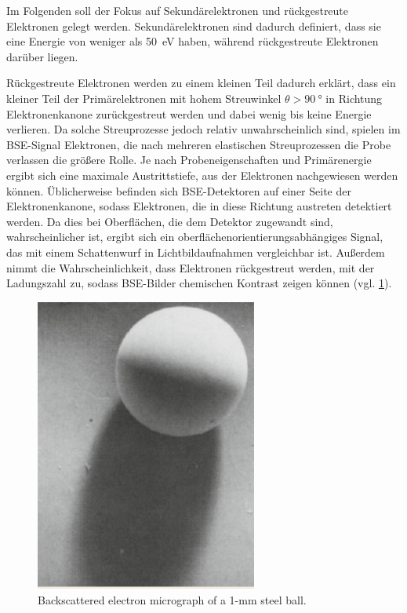 Im Folgenden soll der Fokus auf Sekundärelektronen und rückgestreute Elektronen gelegt werden.
Sekundärelektronen sind dadurch definiert, dass sie eine Energie von weniger als \SI{50}{eV} haben, während rückgestreute Elektronen darüber liegen.

Rückgestreute Elektronen werden zu einem kleinen Teil dadurch erklärt, dass ein kleiner Teil der Primärelektronen mit hohem Streuwinkel $\theta > \SI{90}{\degree}$ in Richtung Elektronenkanone zurückgestreut werden und dabei wenig bis keine Energie verlieren.
Da solche Streuprozesse jedoch relativ unwahrscheinlich sind, spielen im BSE-Signal Elektronen, die nach mehreren elastischen Streuprozessen die Probe verlassen die größere Rolle.
Je nach Probeneigenschaften und Primärenergie ergibt sich eine maximale Austrittstiefe, aus der Elektronen nachgewiesen werden können.
Üblicherweise befinden sich BSE-Detektoren auf einer Seite der Elektronenkanone, sodass Elektronen, die in diese Richtung austreten detektiert werden.
Da dies bei Oberflächen, die dem Detektor zugewandt sind, wahrscheinlicher ist, ergibt sich ein oberflächenorientierungsabhängiges Signal, das mit einem Schattenwurf in Lichtbildaufnahmen vergleichbar ist.
Außerdem nimmt die Wahrscheinlichkeit, dass Elektronen rückgestreut werden, mit der Ladungszahl zu, sodass BSE-Bilder chemischen Kontrast zeigen können (vgl. \cref{fig:bse-schatten}).

\begin{figure}[!ht]
    \centering
    \includegraphics[width=0.65\textwidth]{img/bse-example}
    \caption{
     Backscattered electron micrograph of a 1-mm steel ball. \cite{springer-handbook}
    }
    \label{fig:bse-schatten}
\end{figure}

